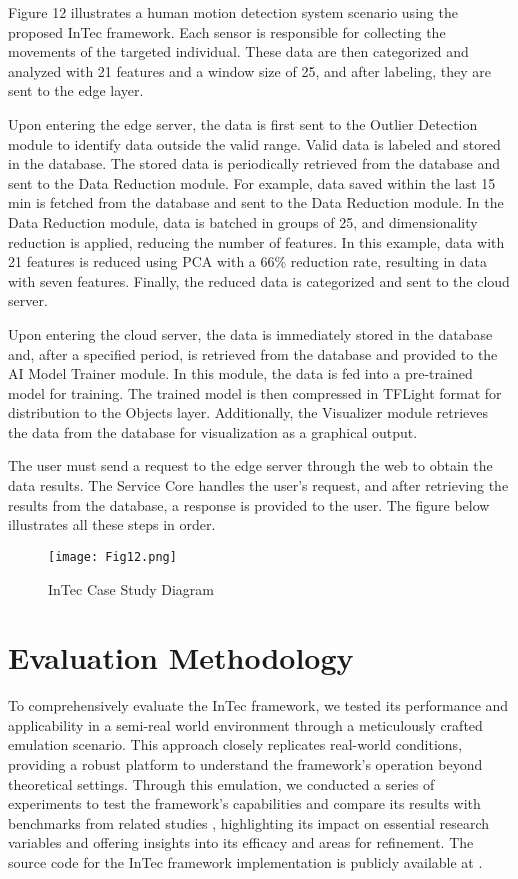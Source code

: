 \documentclass[11pt]{article}
\begin{document}
	Figure 12 illustrates a human motion detection system scenario using the proposed InTec framework. Each sensor is responsible for collecting the movements
	of the targeted individual. These data are then categorized and analyzed with 21
	features and a window size of 25, and after labeling, they are sent to the edge layer.
	
	Upon entering the edge server, the data is first sent to the Outlier Detection module to identify data outside the valid range. Valid data is labeled and stored in the
	database. The stored data is periodically retrieved from the database and sent to the
	Data Reduction module. For example, data saved within the last 15 min is fetched
	from the database and sent to the Data Reduction module. In the Data Reduction
	module, data is batched in groups of 25, and dimensionality reduction is applied,
	reducing the number of features. In this example, data with 21 features is reduced
	using PCA with a 66\% reduction rate, resulting in data with seven features. Finally,
	the reduced data is categorized and sent to the cloud server.
	
	Upon entering the cloud server, the data is immediately stored in the database
	and, after a specified period, is retrieved from the database and provided to the AI
	Model Trainer module. In this module, the data is fed into a pre-trained model for
	training. The trained model is then compressed in TFLight format for distribution
	to the Objects layer. Additionally, the Visualizer module retrieves the data from the
	database for visualization as a graphical output.
	
	The user must send a request to the edge server through the web to obtain the
	data results. The Service Core handles the user’s request, and after retrieving the
	results from the database, a response is provided to the user. The figure below illustrates all these steps in order.
	
	\begin{figure}[th]
		\centering
		\texttt{[image: Fig12.png]}
		\caption{InTec Case Study Diagram}
	\end{figure}
	
	\section{Evaluation Methodology}
	To comprehensively evaluate the InTec framework, we tested its performance and applicability in a semi-real world environment through a meticulously crafted emulation scenario. This approach closely replicates real-world conditions, providing a robust platform to understand the framework's operation beyond theoretical settings. Through this emulation, we conducted a series of experiments to test the framework's capabilities and compare its results with benchmarks from related studies \cite{c15, c16, c17}, highlighting its impact on essential research variables and offering insights into its efficacy and areas for refinement. The source code for the InTec framework implementation is publicly available at \cite{c39}.
	
\end{document}
